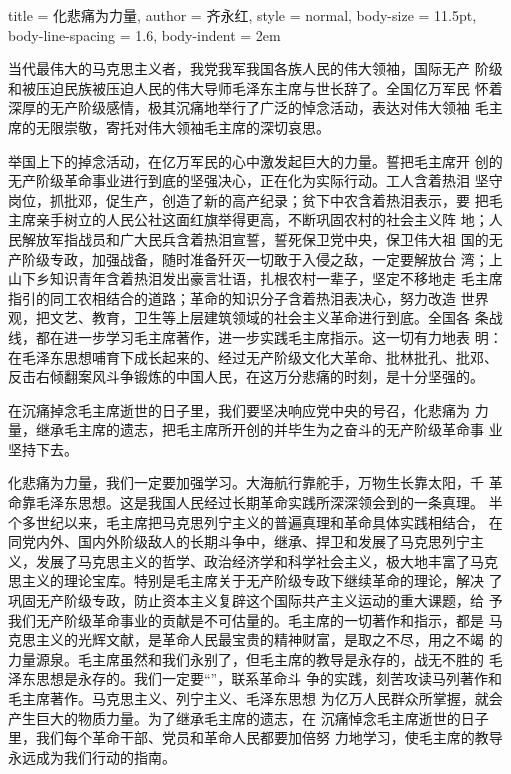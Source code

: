 \begin{hongqiarticle}{
        title  = {化悲痛为力量},
        author = {齐永红},
        style  = normal,
        body-size = 11.5pt,
        body-line-spacing = 1.6,
        body-indent = 2em
    }
    
    当代最伟大的马克思主义者，我党我军我国各族人民的伟大领袖，国际无产
    阶级和被压迫民族被压迫人民的伟大导师毛泽东主席与世长辞了。全国亿万军民
    怀着深厚的无产阶级感情，极其沉痛地举行了广泛的悼念活动，表达对伟大领袖
    毛主席的无限崇敬，寄托对伟大领袖毛主席的深切哀思。
    
    举国上下的掉念活动，在亿万军民的心中激发起巨大的力量。誓把毛主席开
    创的无产阶级革命事业进行到底的坚强决心，正在化为实际行动。工人含着热泪
    坚守岗位，抓批邓，促生产，创造了新的高产纪录；贫下中农含着热泪表示，要
    把毛主席亲手树立的人民公社这面红旗举得更高，不断巩固农村的社会主义阵
    地；人民解放军指战员和广大民兵含着热泪宣誓，誓死保卫党中央，保卫伟大祖
    国的无产阶级专政，加强战备，随时准备歼灭一切敢于入侵之敌，一定要解放台
    湾；上山下乡知识青年含着热泪发出豪言壮语，扎根农村一辈子，坚定不移地走
    毛主席指引的同工农相结合的道路；革命的知识分子含着热泪表决心，努力改造
    世界观，把文艺、教育，卫生等上层建筑领域的社会主义革命进行到底。全国各
    条战线，都在进一步学习毛主席著作，进一步实践毛主席指示。这一切有力地表
    明：在毛泽东思想哺育下成长起来的、经过无产阶级文化大革命、批林批孔、批邓、
    反击右倾翻案风斗争锻炼的中国人民，在这万分悲痛的时刻，是十分坚强的。
    
    在沉痛掉念毛主席逝世的日子里，我们要坚决响应党中央的号召，化悲痛为
    力量，继承毛主席的遗志，把毛主席所开创的并毕生为之奋斗的无产阶级革命事
    业坚持下去。
    
    化悲痛为力量，我们一定要加强学习。大海航行靠舵手，万物生长靠太阳，千
    革命靠毛泽东思想。这是我国人民经过长期革命实践所深深领会到的一条真理。
    半个多世纪以来，毛主席把马克思列宁主义的普遍真理和革命具体实践相结合，
    在同党内外、国内外阶级敌人的长期斗争中，继承、捍卫和发展了马克思列宁主
    义，发展了马克思主义的哲学、政治经济学和科学社会主义，极大地丰富了马克
    思主义的理论宝库。特别是毛主席关于无产阶级专政下继续革命的理论，解决
    了巩固无产阶级专政，防止资本主义复辟这个国际共产主义运动的重大课题，给
    予我们无产阶级革命事业的贡献是不可估量的。毛主席的一切著作和指示，都是
    马克思主义的光辉文献，是革命人民最宝贵的精神财富，是取之不尽，用之不竭
    的力量源泉。毛主席虽然和我们永别了，但毛主席的教导是永存的，战无不胜的
    毛泽东思想是永存的。我们一定要“”，联系革命斗
    争的实践，刻苦攻读马列著作和毛主席著作。马克思主义、列宁主义、毛泽东思想
    为亿万人民群众所掌握，就会产生巨大的物质力量。为了继承毛主席的遗志，在
    沉痛悼念毛主席逝世的日子里，我们每个革命干部、党员和革命人民都要加倍努
    力地学习，使毛主席的教导永远成为我们行动的指南。
    

\end{hongqiarticle}
